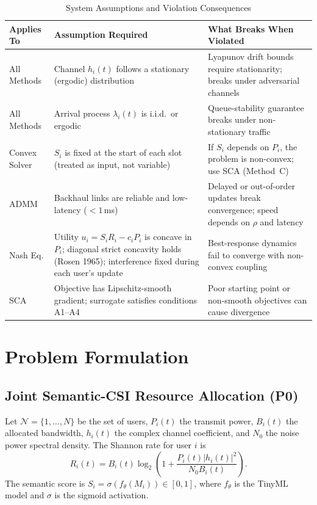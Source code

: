 \documentclass[conference]{IEEEtran}
\begin{document}
\begin{table}[!t]
\renewcommand{\arraystretch}{1.25}
\caption{System Assumptions and Violation Consequences}
\label{tab:assumptions}
\centering
\begin{tabular}{@{}p{2.6cm} p{5.2cm} p{6.5cm}@{}}
\toprule
\textbf{Applies To} & \textbf{Assumption Required} & \textbf{What Breaks When Violated} \\
\midrule
All Methods &
Channel $h_i(t)$ follows a stationary (ergodic) distribution &
Lyapunov drift bounds require stationarity; breaks under adversarial channels \\

All Methods &
Arrival process $\lambda_i(t)$ is i.i.d.\ or ergodic &
Queue-stability guarantee breaks under non-stationary traffic \\

Convex Solver &
$S_i$ is fixed at the start of each slot (treated as input, not variable) &
If $S_i$ depends on $P_i$, the problem is non-convex; use SCA (Method~C) \\

ADMM &
Backhaul links are reliable and low-latency ($<1$\,ms) &
Delayed or out-of-order updates break convergence; speed depends on $\rho$ and latency \\

Nash Eq. &
Utility $u_i = S_i R_i - c_i P_i$ is concave in $P_i$; diagonal strict concavity holds (Rosen 1965); interference fixed during each user's update &
Best-response dynamics fail to converge with non-convex coupling \\

SCA &
Objective has Lipschitz-smooth gradient; surrogate satisfies conditions A1--A4 &
Poor starting point or non-smooth objectives can cause divergence \\
\bottomrule
\end{tabular}
\end{table}

\section{Problem Formulation}
\label{sec:problem}

\subsection{Joint Semantic-CSI Resource Allocation (P0)}

Let $\mathcal{N} = \{1,\ldots,N\}$ be the set of users, $P_i(t)$ the transmit power, $B_i(t)$ the allocated bandwidth, $h_i(t)$ the complex channel coefficient, and $N_0$ the noise power spectral density. The Shannon rate for user $i$ is
\begin{equation}
R_i(t) = B_i(t)\log_2\!\left(1 + \frac{P_i(t)|h_i(t)|^2}{N_0 B_i(t)}\right).
\label{eq:rate}
\end{equation}
The semantic score is $S_i = \sigma(f_\theta(M_i)) \in [0,1]$, where $f_\theta$ is the TinyML model and $\sigma$ is the sigmoid activation.
\end{document}
